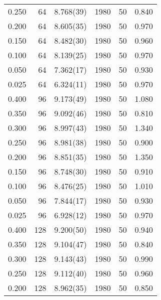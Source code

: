 \begin{tabular}{rrlrrr}
 0.250 &      64 & 8.768(39)  &                 1980 &                   50 &    0.840 \\
 0.200 &      64 & 8.605(35)  &                 1980 &                   50 &    0.970 \\
 0.150 &      64 & 8.482(30)  &                 1980 &                   50 &    0.960 \\
 0.100 &      64 & 8.139(25)  &                 1980 &                   50 &    0.970 \\
 0.050 &      64 & 7.362(17)  &                 1980 &                   50 &    0.930 \\
 0.025 &      64 & 6.324(11)  &                 1980 &                   50 &    0.970 \\
 0.400 &      96 & 9.173(49)  &                 1980 &                   50 &    1.080 \\
 0.350 &      96 & 9.092(46)  &                 1980 &                   50 &    0.810 \\
 0.300 &      96 & 8.997(43)  &                 1980 &                   50 &    1.340 \\
 0.250 &      96 & 8.981(38)  &                 1980 &                   50 &    0.900 \\
 0.200 &      96 & 8.851(35)  &                 1980 &                   50 &    1.350 \\
 0.150 &      96 & 8.748(30)  &                 1980 &                   50 &    0.910 \\
 0.100 &      96 & 8.476(25)  &                 1980 &                   50 &    1.010 \\
 0.050 &      96 & 7.844(17)  &                 1980 &                   50 &    0.930 \\
 0.025 &      96 & 6.928(12)  &                 1980 &                   50 &    0.970 \\
 0.400 &     128 & 9.200(50)  &                 1980 &                   50 &    0.940 \\
 0.350 &     128 & 9.104(47)  &                 1980 &                   50 &    0.840 \\
 0.300 &     128 & 9.143(43)  &                 1980 &                   50 &    0.990 \\
 0.250 &     128 & 9.112(40)  &                 1980 &                   50 &    0.960 \\
 0.200 &     128 & 8.962(35)  &                 1980 &                   50 &    0.850 \\

\end{tabular}
